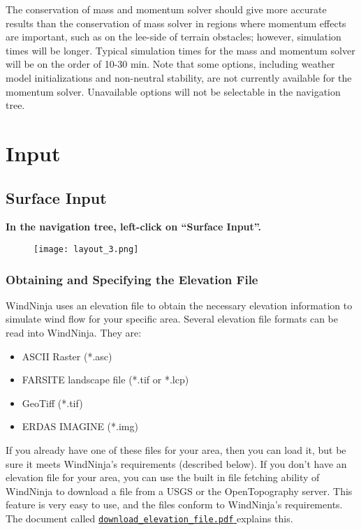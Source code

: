\documentclass[12pt]{article}
\begin{document}
The conservation of mass and momentum solver should give more accurate results than the conservation of mass solver in regions where momentum effects are important, such as on the lee-side of terrain obstacles; however, simulation times will be longer. Typical simulation times for the mass and momentum solver will be on the order of 10-30 min. Note that some options, including weather model initializations and non-neutral stability, are not currently available for the momentum solver. Unavailable options will not be selectable in the navigation tree.

\section{Input}
\subsection{Surface Input}

\textbf{\color{red}In the navigation tree, left-click on “Surface Input”.}

\begin{figure}[H]
	\centering
	\label{}
	\texttt{[image: layout\_3.png]}
\end{figure}

\subsubsection{Obtaining and Specifying the Elevation File}

WindNinja uses an elevation file to obtain the necessary elevation information to simulate wind flow for your specific area.  Several elevation file formats can be read into WindNinja.  They are:

\begin{itemize}
\item[]ASCII Raster (*.asc)
\item[]FARSITE landscape file (*.tif or *.lcp)
\item[]GeoTiff (*.tif)
\item[]ERDAS IMAGINE (*.img)
\end{itemize}

If you already have one of these files for your area, then you can load it, but be sure it meets WindNinja's requirements (described below).  If you don't have an elevation file for your area, you can use the built in file fetching ability of WindNinja to download a file from a USGS or the OpenTopography server.  This feature is very easy to use, and the files conform to WindNinja's requirements.  The document called \href{https://weather.firelab.org/windninja/tutorials/download_elevation_file.pdf}{\texttt{download\_elevation\_file.pdf} } explains this.
\end{document}
